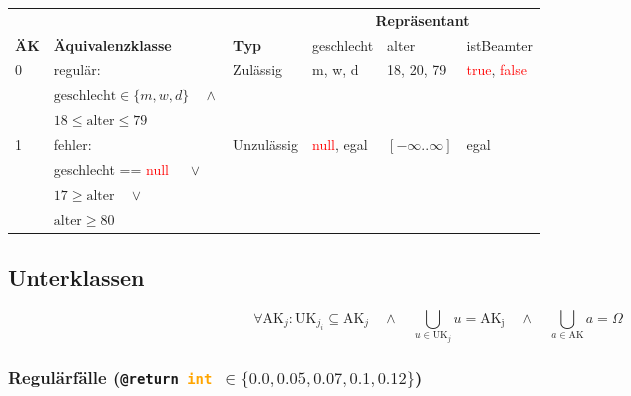 \documentclass{article}
\begin{document}
\begin{enumerate}[label=\alph*.]
            \begin{tabularx}{\textwidth}{|p{3em}|X|p{7em}|p{5em}|p{7em}|p{5em}|}
                \hline
                \cellcolor[gray]{0.75} & \cellcolor[gray]{0.75} & \cellcolor[gray]{0.75} & \multicolumn{3}{c|}{\cellcolor[gray]{0.75} \textbf{Repräsentant}}\\
                \multirow{-2}{*}{\cellcolor[gray]{0.75} \textbf{ÄK}} & \multirow{-2}{*}{\cellcolor[gray]{0.75} \textbf{Äquivalenzklasse}} & \multirow{-2}{*}{\cellcolor[gray]{0.75} \textbf{Typ}} & \cellcolor[gray]{0.75} geschlecht & \cellcolor[gray]{0.75} alter & \cellcolor[gray]{0.75} istBeamter\\\hline  
                0 & regulär: & Zulässig & m, w, d & 18, 20, 79 & \textcolor{red}{true}, \textcolor{red}{false} \\
                & $\mathrm{geschlecht} \in \{m, w, d\} \quad \land$ & & & & \\
                & $18 \leq \mathrm{alter} \leq 79$ & & & & \\\hline
                1 & fehler: & Unzulässig & \textcolor{red}{null}, egal & $[-\infty..\infty]$ & egal \\
                & geschlecht == \textcolor{red}{null} $\quad \lor$ & & & & \\
                & $17 \geq \mathrm{alter} \quad \lor$ & & & & \\
                & $\mathrm{alter} \geq 80$ & & & & \\\hline
            \end{tabularx}

            \subsection*{Unterklassen}

            \[
                \forall \mathrm{AK}_j : \mathrm{UK}_{j_i} \subseteq \mathrm{AK}_j \quad \land \quad 
                \bigcup_{u \in \mathrm{UK}_j} u = \mathrm{AK_j} \quad \land \quad 
                \bigcup_{a \in \mathrm{AK}} a = \Omega
            \]

            \subsubsection*{Regulärfälle (\texttt{@return \textcolor{orange}{int} $\in \{0.0, 0.05, 0.07, 0.1, 0.12\}$})}
            

\end{enumerate}
\end{document}
